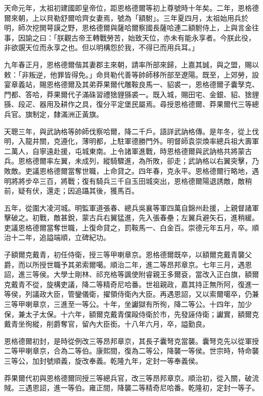\begin{pinyinscope}
天命元年，太祖初建國即皇帝位，距恩格德爾等初上尊號時十年矣。二年，恩格德爾來朝，上以貝勒舒爾哈齊女妻焉，號為「額駙」。三年夏四月，太祖始用兵於明，師次挖閧萼謨之野，恩格德爾與薩哈爾察國長薩哈連二額駙侍上，上與言金往事，因諭之曰：「朕觀古帝王轉戰勞苦，始致天位，亦未有能永享者。今朕此役，非欲覬天位而永享之也。但以明構怨於我，不得已而用兵耳。」

九年春正月，恩格德爾偕其妻郡主來朝，請率所部來歸，上嘉其誠，與之盟，賜以敕：「非叛逆，他罪皆得免。」命貝勒代善等帥師移所部至遼陽。既至，上郊勞，設宴章義站，賜恩格德爾及其弟莽果爾代雕鞍良馬一、貂裘一，恩格德爾子囊孥克、門都、答哈，莽果爾代子滿硃習禮猞貍猻裘一。既入城，賜田宅、金銀、貂、猞貍猻、段疋、器用及耕作之具，復分平定堡民屬焉。尋授恩格德爾、莽果爾代三等總兵官。旗制定，隸滿洲正黃旗。

天聰三年，與武訥格等帥師伐察哈爾，降二千戶。語詳武訥格傳。是年冬，從上伐明，入龍井關，克遵化，薄明都，上駐軍德勝門外。明督師袁崇煥率總兵祖大壽軍二萬人，自寧遠赴援，屯城東南。上令諸軍進戰，時恩格德爾與武訥格共將蒙古兵。恩格德爾率左翼，未成列，縱騎驟進，為所敗，卻走；武訥格以右翼突擊，乃敗敵。吏議恩格德爾當奪世職，上命貸之。四年春，克永平。恩格德爾行略地，遇明將將步卒三百，將戰；復有騎兵三千自玉田城突出，恩格德爾陽退誘敵，敵稍前，疑有伏，還走；因追躡其後，獲馬百。

五年，從圍大凌河城。明監軍道張春、總兵吳襄等軍四萬自錦州赴援，上親督諸軍擊破之。初戰，敵甚銳，蒙古兵右翼猛進，先入張春壘；左翼兵避矢石，進稍緩。吏議恩格德爾當奪世職，上復命貸之，罰鞍馬一、白金百。崇德元年五月，卒。順治十二年，追謚端順，立碑紀功。

子額爾克戴青，初任侍衛，授三等甲喇章京。恩格德爾既卒，以額爾克戴青襲父爵，而以所授世職予其弟索爾噶。順治二年，進二等昂邦章京。七年三月，遇恩詔，進三等侯。大學士剛林、祁充格等諷使附睿親王多爾袞，當改入正白旗，額爾克戴青不從，旋構吏議，降二等精奇尼哈番。世祖親政，嘉其持正無所阿，復進一等侯，列議政大臣，管鑾儀衛，擢領侍衛內大臣。再遇恩詔，又以索爾噶卒，仍兼三等甲喇章京，三進至一等公。十年，坐讞獄有所徇，降二等公。十四年，加少保，兼太子太保。十六年，額爾克戴青僕毆侍衛於市，先發誣侍衛；讞實，額爾克戴青坐徇縱，削爵奪官，留內大臣銜。十八年六月，卒，謚勤良。

恩格德爾初封，是時從例改三等昂邦章京，其長子囊弩克當襲。囊弩克先以從軍授二等甲喇章京，合為二等伯。康熙間，復為二等公，降襲一等侯。世宗時，特命襲三等公，加封號順義，旋改奉義。乾隆九年，定封一等奉義侯。

莽果爾代初與恩格德爾同授三等總兵官，改三等昂邦章京。順治初，從入關，破流賊。三遇恩詔，進一等伯。雍正間，降襲二等精奇尼哈番。乾隆初，定封一等子。


\end{pinyinscope}
